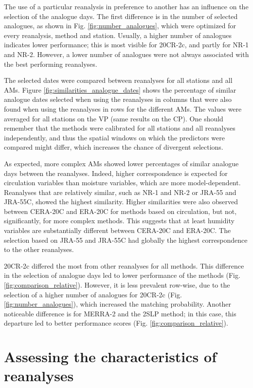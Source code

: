 \documentclass[smallextended]{svjour3}       %
\begin{document}
	The use of a particular reanalysis in preference to another has an influence on the selection of the analogue days. The first difference is in the number of selected analogues, as shown in Fig. \ref{fig:number_analogues}, which were optimized for every reanalysis, method and station. Usually, a higher number of analogues indicates lower performance; this is most visible for 20CR-2c, and partly for NR-1 and NR-2. However, a lower number of analogues were not always associated with the best performing reanalyses.
	
	The selected dates were compared between reanalyses for all stations and all AMs. Figure \ref{fig:similarities_analogue_dates} shows the percentage of similar analogue dates selected when using the reanalyses in columns that were also found when using the reanalyses in rows for the different AMs. The values were averaged for all stations on the VP (same results on the CP). One should remember that the methods were calibrated for all stations and all reanalyses independently, and thus the spatial windows on which the predictors were compared might differ, which increases the chance of divergent selections.
	
	As expected, more complex AMs showed lower percentages of similar analogue days between the reanalyses. Indeed, higher correspondence is expected for circulation variables than moisture variables, which are more model-dependent. Reanalyses that are relatively similar, such as NR-1 and NR-2 or JRA-55 and JRA-55C, showed the highest similarity. Higher similarities were also observed between CERA-20C and ERA-20C for methods based on circulation, but not, significantly, for more complex methods. This suggests that at least humidity variables are substantially different between CERA-20C and ERA-20C. The selection based on JRA-55 and JRA-55C had globally the highest correspondence to the other reanalyses.
	
	20CR-2c differed the most from other reanalyses for all methods. This difference in the selection of analogue days led to lower performance of the methods (Fig. \ref{fig:comparison_relative}). However, it is less prevalent row-wise, due to the selection of a higher number of analogues for 20CR-2c (Fig. \ref{fig:number_analogues}), which increased the matching probability. Another noticeable difference is for MERRA-2 and the 2SLP method; in this case, this departure led to better performance scores (Fig. \ref{fig:comparison_relative}).
	
	
	\section{Assessing the characteristics of reanalyses}
	\label{sec:analyzes}
	
\end{document}
